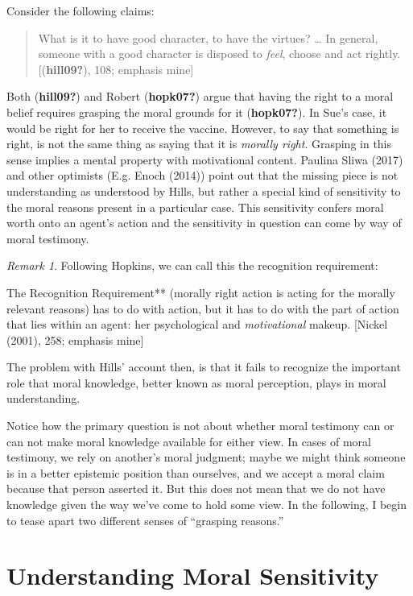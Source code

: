 \documentclass[12pt]{book}
\theoremstyle{definition}
\theoremstyle{remark}
\newtheorem{remark}[theorem]{Remark}
\begin{document}
\noindent Consider the following claims:

\begin{quote}
What is it to have good character, to have the virtues? \ldots{} In general, someone with a good character is disposed to \emph{feel}, choose and act rightly. {[}(\textbf{hill09?}), 108; emphasis mine{]}
\end{quote}

Both (\textbf{hill09?}) and Robert (\textbf{hopk07?}) argue that having the right to a moral belief requires grasping the moral grounds for it (\textbf{hopk07?}). In Sue's case, it would be right for her to receive the vaccine. However, to say that something is right, is not the same thing as saying that it is \emph{morally right}. Grasping in this sense implies a mental property with motivational content. Paulina Sliwa (2017) and other optimists (E.g. Enoch (2014)) point out that the missing piece is not understanding as understood by Hills, but rather a special kind of sensitivity to the moral reasons present in a particular case. This sensitivity confers moral worth onto an agent's action and the sensitivity in question can come by way of moral testimony.

\begin{remark}
Following Hopkins, we can call this the recognition requirement:

The Recognition Requirement** (morally right action is acting for the morally relevant reasons) has to do with action, but it has to do with the part of action that lies within an agent: her psychological and \emph{motivational} makeup. {[}Nickel (2001), 258; emphasis mine{]}
\end{remark}

The problem with Hills' account then, is that it fails to recognize the important role that moral knowledge, better known as moral perception, plays in moral understanding.

Notice how the primary question is not about whether moral testimony can or can not make moral knowledge available for either view. In cases of moral testimony, we rely on another's moral judgment; maybe we might think someone is in a better epistemic position than ourselves, and we accept a moral claim because that person asserted it. But this does not mean that we do not have knowledge given the way we've come to hold some view. In the following, I begin to tease apart two different senses of ``grasping reasons.''

\section{Understanding Moral Sensitivity}\label{understanding-moral-sensitivity}
\end{document}
